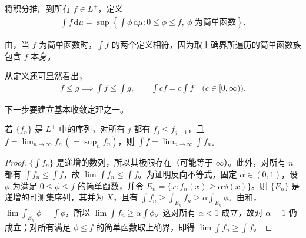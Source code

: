 \documentclass[../../main.tex]{subfiles}%
\begin{document}
\begin{definition}[非负可测函数的积分]\label{definition:ch02-nonnegative-integral}
将积分推广到所有 $f\in L^+$，定义
\begin{align*}
\int f\,\mathrm{d}\mu=\sup\left\{\int\phi\,\mathrm{d}\mu:0\le\phi\le f,\ \phi\text{ 为简单函数}\right\}.
\end{align*}
\end{definition}
\begin{remark}
由，当 $f$ 为简单函数时，$\int f$ 的两个定义相符，因为取上确界所遍历的简单函数族包含 $f$ 本身。
\end{remark}
\begin{proposition}\label{proposition:ch02-nonnegative-integral-basic-properties}
从定义还可显然看出，
\begin{align*}
f\le g\implies\int f\le\int g,\qquad
\int cf=c\int f\quad\bigl(c\in[0,\infty)\bigr).
\end{align*}
\end{proposition}
下一步要建立基本收敛定理之一。
\begin{theorem}[单调收敛定理]\label{theorem:ch02-monotone-convergence}
若 $\{f_n\}$ 是 $L^+$ 中的序列，对所有 $j$ 都有 $f_j\le f_{j+1}$，且 $f=\lim_{n\to\infty}f_n\,(=\sup_n f_n)$，则 $\int f=\lim_{n\to\infty}\int f_n$。
\end{theorem}
\begin{proof}
$\{\int f_n\}$ 是递增的数列，所以其极限存在（可能等于 $\infty$）。此外，对所有 $n$ 都有 $\int f_n\le\int f$，故 $\lim\int f_n\le\int f$。为证明反向不等式，固定 $\alpha\in(0,1)$，设 $\phi$ 为满足 $0\le\phi\le f$ 的简单函数，并令 $E_n=\{x:f_n(x)\ge\alpha\phi(x)\}$。则 $\{E_n\}$ 是递增的可测集序列，其并为 $X$，且有 $\int f_n\ge\int_{E_n}f_n\ge\alpha\int_{E_n}\phi$。由和，$\lim\int_{E_n}\phi=\int\phi$，所以 $\lim\int f_n\ge\alpha\int\phi$。这对所有 $\alpha<1$ 成立，故对 $\alpha=1$ 仍成立；对所有满足 $\phi\le f$ 的简单函数取上确界，即得 $\lim\int f_n\ge\int f$。
\end{proof}
\end{document}
